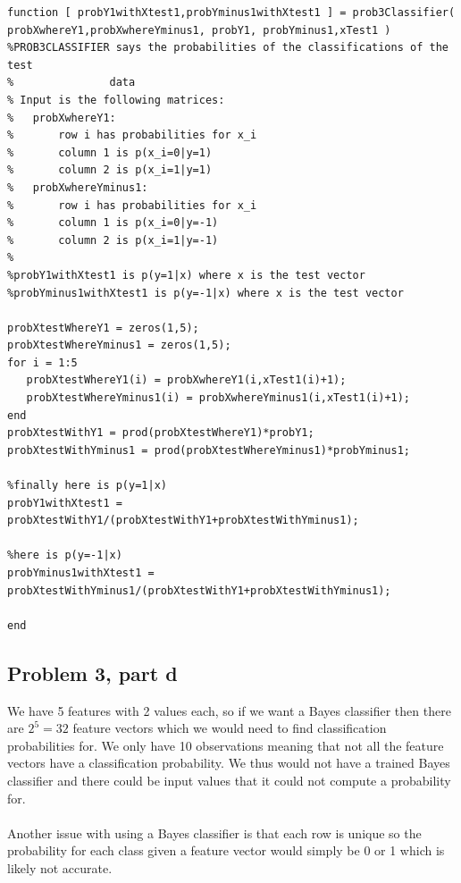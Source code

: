 \documentclass[11pt,psfig]{article}
\begin{document}
\begin{verbatim}
function [ probY1withXtest1,probYminus1withXtest1 ] = prob3Classifier( 
probXwhereY1,probXwhereYminus1, probY1, probYminus1,xTest1 )
%PROB3CLASSIFIER says the probabilities of the classifications of the test
%               data
% Input is the following matrices:
%   probXwhereY1:
%       row i has probabilities for x_i
%       column 1 is p(x_i=0|y=1)
%       column 2 is p(x_i=1|y=1)
%   probXwhereYminus1:
%       row i has probabilities for x_i
%       column 1 is p(x_i=0|y=-1)
%       column 2 is p(x_i=1|y=-1)
%
%probY1withXtest1 is p(y=1|x) where x is the test vector
%probYminus1withXtest1 is p(y=-1|x) where x is the test vector

probXtestWhereY1 = zeros(1,5);
probXtestWhereYminus1 = zeros(1,5);
for i = 1:5
   probXtestWhereY1(i) = probXwhereY1(i,xTest1(i)+1); 
   probXtestWhereYminus1(i) = probXwhereYminus1(i,xTest1(i)+1); 
end
probXtestWithY1 = prod(probXtestWhereY1)*probY1;
probXtestWithYminus1 = prod(probXtestWhereYminus1)*probYminus1;

%finally here is p(y=1|x)
probY1withXtest1 = probXtestWithY1/(probXtestWithY1+probXtestWithYminus1);

%here is p(y=-1|x)
probYminus1withXtest1 = probXtestWithYminus1/(probXtestWithY1+probXtestWithYminus1);

end
\end{verbatim}

\newpage

\subsection*{Problem 3, part d}

We have 5 features with 2 values each, so if we want a Bayes classifier then there are $2^5=32$ feature vectors which we would need to find classification probabilities for. We only have 10 observations meaning that not all the feature vectors have a classification probability. We thus would not have a trained Bayes classifier and there could be input values that it could not compute a probability for.\\
\\
Another issue with using a Bayes classifier is that each row is unique so the probability for each class given a feature vector would simply be 0 or 1 which is likely not accurate.
\end{document}
